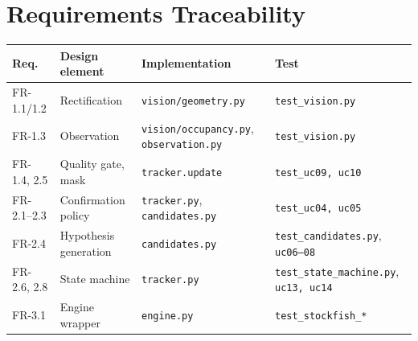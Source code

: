 \section{Requirements Traceability}
\begin{longtable}{p{}p{}p{}p{}}
\toprule Req. & Design element & Implementation & Test\\ \midrule
FR-1.1/1.2 & Rectification & \texttt{vision/geometry.py} & \texttt{test\_vision.py}\\
FR-1.3 & Observation & \texttt{vision/occupancy.py}, \texttt{observation.py} & \texttt{test\_vision.py}\\
FR-1.4, 2.5 & Quality gate, mask & \texttt{tracker.update} & \texttt{test\_uc09, uc10}\\
FR-2.1--2.3 & Confirmation policy & \texttt{tracker.py}, \texttt{candidates.py} & \texttt{test\_uc04, uc05}\\
FR-2.4 & Hypothesis generation & \texttt{candidates.py} & \texttt{test\_candidates.py}, \texttt{uc06--08}\\
FR-2.6, 2.8 & State machine & \texttt{tracker.py} & \texttt{test\_state\_machine.py}, \texttt{uc13, uc14}\\
FR-3.1 & Engine wrapper & \texttt{engine.py} & \texttt{test\_stockfish\_*}\\
\bottomrule
\end{longtable}
